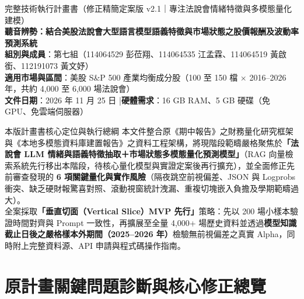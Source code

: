 \documentclass[11pt, a4paper]{article}
\begin{document}
\begin{tcolorbox}[
    enhanced,
    colback=NavyPrimary,
    colframe=NavyPrimary,
    arc=4pt,
    left=14pt, right=14pt, top=14pt, bottom=14pt
]
    {\small\color{SlateBorder}完整技術執行計畫書（修正精簡定案版 v2.1｜專注法說會情緒特徵與多模態量化建模）}\\[6pt]
    {\LARGE\bfseries\color{white}聽音辨勢：結合美股法說會大型語言模型語義特徵與市場狀態之股價報酬及波動率預測系統}\\[10pt]
    {\small\color{white}
    \textbf{組別與成員}：第七組（114064529 彭莅翔、114064535 江孟霖、114064519 黃啟銜、112191073 黃文妤）\\[2pt]
    \textbf{適用市場與區間}：美股 S\&P 500 產業均衡成分股（100 至 150 檔 $\times$ 2016--2026 年，共約 4,000 至 6,000 場法說會）\\[2pt]
    \textbf{文件日期}：2026 年 11 月 25 日 \quad|\quad \textbf{硬體需求}：16 GB RAM、5 GB 硬碟（免 GPU、免雲端伺服器）
    }
\end{tcolorbox}

\vspace{4pt}

\begin{summarybox}{本版計畫書核心定位與執行總綱}
本文件整合原《期中報告》之財務量化研究框架與《本地多模態資料庫建置報告》之資料工程架構，將現階段範疇嚴格聚焦於\textbf{「法說會 LLM 情緒與語義特徵抽取＋市場狀態多模態量化預測模型」}（RAG 向量檢索系統先行移出本階段，待核心量化模型與實證定案後再行擴充），並全面修正先前審查發現的 \textbf{6 項關鍵量化與實作風險}（隔夜跳空前視偏差、JSON 與 Logprobs 衝突、缺乏硬財報驚喜對照、滾動視窗統計洩漏、重複切塊嵌入負擔及學期範疇過大）。\\
全案採取\textbf{「垂直切面（Vertical Slice）MVP 先行」}策略：先以 200 場小樣本驗證時間對齊與 Prompt 一致性，再擴展至全量 4,000+ 場歷史資料並透過\textbf{模型知識截止日後之嚴格樣本外期間（2025--2026 年）}檢驗無前視偏差之真實 Alpha，同時附上完整資料源、API 申請與程式碼操作指南。
\end{summarybox}

\vspace{2pt}
\setcounter{tocdepth}{2}
{\small\setlength{\parskip}{1pt}\linespread{1.05}\selectfont\tableofcontents}
\newpage

\section{原計畫關鍵問題診斷與核心修正總覽}
\end{document}
